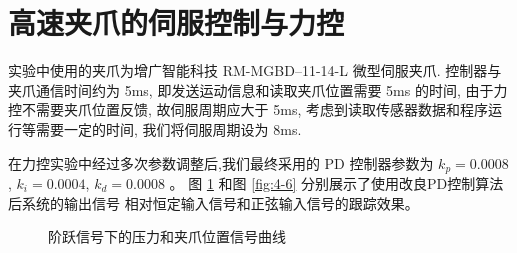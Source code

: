 \section{高速夹爪的伺服控制与力控}
实验中使用的夹爪为增广智能科技 RM-MGBD--11-14-L 微型伺服夹爪.
控制器与夹爪通信时间约为 5ms, 即发送运动信息和读取夹爪位置需要 5ms 的时间,
由于力控不需要夹爪位置反馈, 故伺服周期应大于 5ms,
考虑到读取传感器数据和程序运行等需要一定的时间, 我们将伺服周期设为 8ms.

在力控实验中经过多次参数调整后,我们最终采用的 PD 控制器参数为
$k_p = 0.0008$ , $k_i = 0.0004$, $k_d = 0.0008$ 。
图 \ref{fig:4-5} 和图 \ref{fig:4-6} 分别展示了使用改良PD控制算法后系统的输出信号
相对恒定输入信号和正弦输入信号的跟踪效果。


\begin{figure}[!h]
  \centering
    \hspace{0pt}
  \caption{\label{fig:4-5}阶跃信号下的压力和夹爪位置信号曲线}
  \vspace{-0.3cm}
\end{figure}


